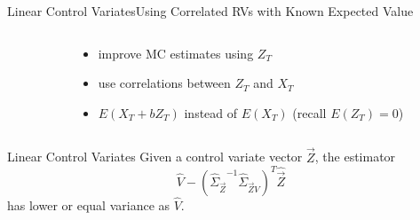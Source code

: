\documentclass[10pt]{beamer}
\newcommand{\expSym}{{E}}
\newcommand{\E}[1]{\ensuremath{\expSym\left(#1\right)}}
\newcommand{\T}{T}
\newcommand{\bottomcite}[1]{\vspace*{\fill} {\scriptsize \parencite{#1}}}
\begin{document}
\begin{frame}{Linear Control Variates}{Using Correlated RVs with Known Expected Value}
\begin{columns}
\begin{column}{.45\paperwidth}
        \end{column}
        \begin{column}{.54\paperwidth}
            \begin{itemize}
                \item improve MC estimates using $Z_T$
                \item use correlations between $Z_T$ and $X_T$
                \item $\E{X_T + b Z_T}$ instead of $\E{X_T}$ (recall $\E{Z_T}=0$)
            \end{itemize}
        \end{column}
    \end{columns}
        \begin{block}{Linear Control Variates}
            Given a control variate vector $\vec{Z}$, the estimator
            \[\hat{V} -({\hat\Sigma_{ \vec{Z}}}^{-1}{\hat\Sigma}_{ \vec{Z} V})^{\T}{\hat{\vec{Z}}} \]
            has lower or equal variance as $\hat{V}$.
        \end{block}
    \bottomcite{backenkohler2019control}
\end{frame}
\end{document}
